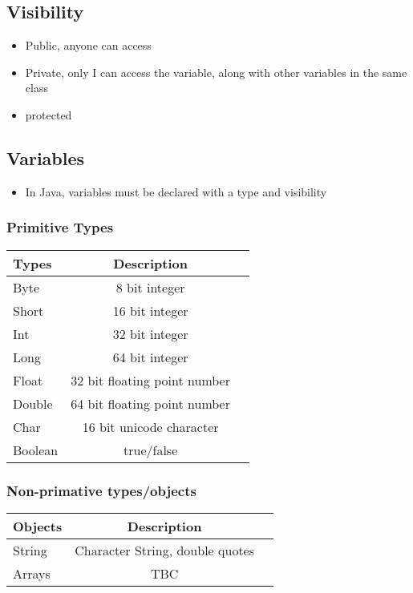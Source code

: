 \documentclass[a4paper,11pt]{article}
\theoremstyle{mytheor}
\begin{document}
\subsection*{Visibility}
\begin{itemize}
\item Public, anyone can access
\item Private, only I can access the variable, along with other variables in the same class
\item protected
\end{itemize}
\subsection*{Variables}
\begin{itemize}
\item In Java, variables must be declared with a type and visibility
\end{itemize}

\subsubsection*{Primitive Types}
\begin{tabular}{l|cc}
  Types& Description & \\
  \hline
  Byte & 8 bit integer & \\
  Short& 16 bit integer & \\
  Int& 32 bit integer & \\
  Long & 64 bit integer & \\
  Float& 32 bit floating point number & \\
  Double& 64 bit floating point number & \\
  Char& 16 bit unicode character & \\
  Boolean& true/false &
\end{tabular}

\subsubsection*{Non-primative types/objects}
\begin{tabular}{l|cc}
  Objects& Description & \\
  \hline
  String & Character String, double quotes & \\
  Arrays& TBC &
\end{tabular}
\end{document}
